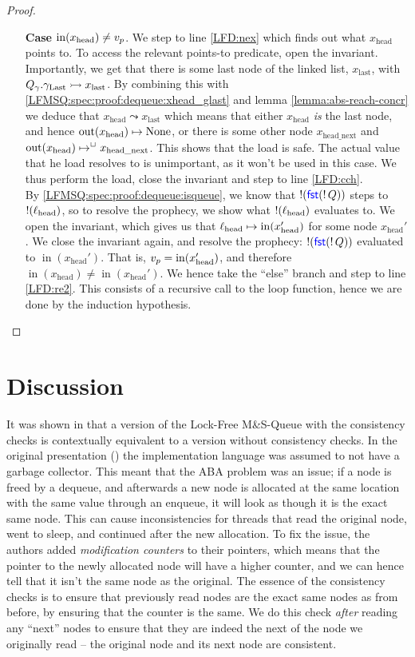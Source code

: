 \documentclass[a4paper, 10pt]{report}
\theoremstyle{definition}
\newcommand{\msq}{M\&S-Queue\xspace}
\newcommand{\lfmsq}{Lock-Free \msq}
\newcommand{\locN}[1]{\loc_{\mathrm{#1}}}
\newcommand{\lochead}{\locN{head}}
\newcommand{\nIn}[1]{\operatorname{in}(#1)}
\newcommand{\nOut}[1]{\operatorname{out}(#1)}
\newcommand{\node}{x}
\newcommand{\nodeN}[1]{\node_{\mathrm{#1}}}
\newcommand{\nodehead}{\nodeN{head}}
\newcommand{\nodelast}{\nodeN{last}}
\newcommand{\nodeheadnext}{\nodeN{head\_next}}
\newcommand{\prophval}{\val_p}
\newcommand{\Qg}{Q_\gname}
\newcommand{\glast}{\gname_{\mathrm{Last}}}
\newcommand{\reach}[2]{#1 \leadsto #2}
\newcommand{\ap}[2]{#1 \rightarrowtail #2}
\begin{document}
\begin{proof}
\begin{itemize}
    \item[\textbf{Case}] $\nIn{\nodehead} \neq \prophval$.
    We step to line \ref{LFD:nex} which finds out what $\nodehead$ points to. To access the relevant points-to predicate, open the invariant. Importantly, we get that there is some last node of the linked list, $\nodelast$, with $\ap{\Qg.\glast}{\nodelast}$. By combining this with \ref{LFMSQ:spec:proof:dequeue:xhead_glast} and lemma \ref{lemma:abs-reach-concr} we deduce that $\reach{\nodehead}{\nodelast}$ which means that either $\nodehead$ \textit{is} the last node, and hence $\nOut{\nodehead} \mapsto \None$, or there is some other node $\nodeheadnext$ and $\nOut{\nodehead} \mapsto^{\persistently} \nodeheadnext$. This shows that the load is safe. The actual value that he load resolves to is unimportant, as it won't be used in this case. We thus perform the load, close the invariant and step to line \ref{LFD:cch}.\\
    By \ref{LFMSQ:spec:proof:dequeue:isqueue}, we know that $\mathop{!}(\operatorname{\textsf{\color{blue} fst}} (\mathop{!} Q))$ steps to $\deref(\lochead)$, so to resolve the prophecy, we show what $\deref(\lochead)$ evaluates to. We open the invariant, which gives us that $\lochead \mapsto \nIn{\nodehead'}$ for some node $\nodehead'$. We close the invariant again, and resolve the prophecy: $\mathop{!}(\operatorname{\textsf{\color{blue} fst}} (\mathop{!} Q))$ evaluated to $\nIn{\nodehead'}$. That is, $\prophval = \nIn{\nodehead'}$, and therefore $\nIn{\nodehead} \neq \nIn{\nodehead'}$. We hence take the ``else'' branch and step to line \ref{LFD:re2}. This consists of a recursive call to the loop function, hence we are done by the induction hypothesis.
  \end{itemize}
\end{proof}


\section{Discussion}
\label{LFMSQ:section:discussion}

It was shown in \cite{DBLP:conf/cpp/VindumB21} that a version of the \lfmsq with the consistency checks is contextually equivalent to a version without consistency checks. In the original presentation (\cite{DBLP:conf/podc/MichaelS96}) the implementation language was assumed to not have a garbage collector. This meant that the ABA problem was an issue; if a node is freed by a dequeue, and afterwards a new node is allocated at the same location with the same value through an enqueue, it will look as though it is the exact same node. This can cause inconsistencies for threads that read the original node, went to sleep, and continued after the new allocation. 
To fix the issue, the authors added \textit{modification counters} to their pointers, which means that the pointer to the newly allocated node will have a higher counter, and we can hence tell that it isn't the same node as the original. The essence of the consistency checks is to ensure that previously read nodes are the exact same nodes as from before, by ensuring that the counter is the same.
We do this check \textit{after} reading any ``next'' nodes to ensure that they are indeed the next of the node we originally read -- the original node and its next node are consistent.
\end{document}
